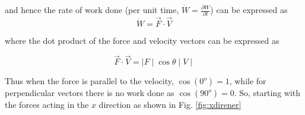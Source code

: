 	and hence the rate of work done (per unit time, $\dot{W}=\frac{\partial W}{\partial t}$) can be expressed as
\begin{equation}
	\dot{W} = \vec{F} \cdot \vec{V}
\label{eqn:dworkdt}
\end{equation}

	where the dot product of the force and velocity vectors can be expressed as

\begin{equation}
	\vec{F} \cdot \vec{V} = \mid F \mid \cos \theta \mid V \mid
\label{eqn:workdotproduct}
\end{equation}

	Thus when the force is parallel to the velocity, $\cos (0^o) = 1$, while for perpendicular vectors
there is no work done as $\cos (90^o) = 0$.  So, starting with the forces acting in the $x$ direction as shown
in Fig. \ref{fig:xdirener}


